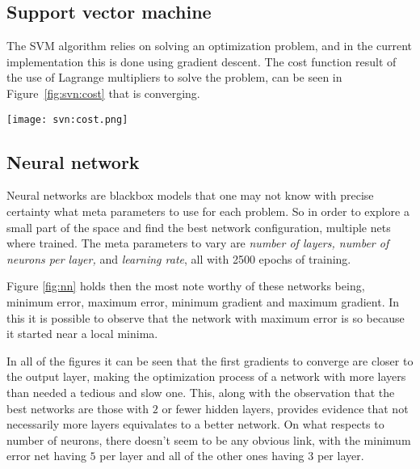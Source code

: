 
\subsection{Support vector machine}

The SVM algorithm relies on solving an optimization problem, and in the current
implementation this is done using gradient descent. The cost function result
of the use of Lagrange multipliers to solve the problem, can be seen in
Figure~\ref{fig:svn:cost} that is converging.

\begin{figure*}[t]
    \texttt{[image: svn:cost.png]}
    \caption{Cost function of the optimization problem for SVM
    \label{fig:svn:cost}}
\end{figure*}

\subsection{Neural network}

Neural networks are blackbox models that one may not know with precise certainty
what meta parameters to use for each problem. So in order to explore a small
part of the space and find the best network configuration, multiple nets where
trained. The meta parameters to vary are \textit{number of layers, number of
neurons per layer,} and \textit{learning rate}, all with 2500 epochs of
training. 

Figure \ref{fig:nn} holds then the most note worthy of these networks
being, minimum error, maximum error, minimum gradient and maximum gradient.
In this it is possible to observe that the network with maximum error is so
because it started near a local minima. 

In all of the figures it can be seen that the first gradients to converge are
closer to the output layer, making the optimization process of a network with
more layers than needed a tedious and slow one. This, along with the observation
that the best networks are those with $2$ or fewer hidden layers, provides
evidence that not necessarily more layers equivalates to a better network. On
what respects to number of neurons, there doesn't seem to be any obvious link,
with the minimum error net having $5$ per layer and all of the other ones having
$3$ per layer.

